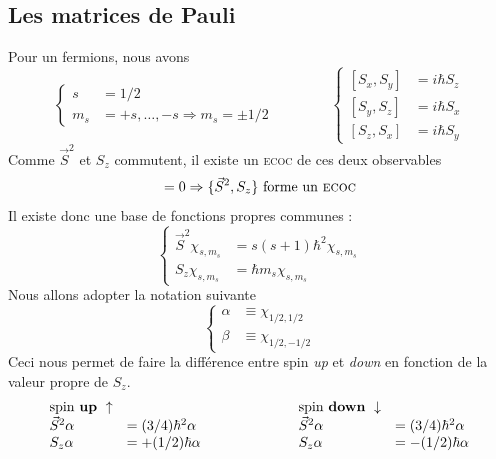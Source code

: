 \subsection{Les matrices de Pauli}
Pour un fermions, nous avons 
\begin{equation}
\left\{\begin{array}{ll}
s &= 1/2\\
m_s &= +s, \dots, -s \Rightarrow m_s = \pm 1/2
\end{array}\right.\qquad\qquad\left\{\begin{array}{ll}
\left[S_x,S_y\right] &= i\hbar S_z\\
\left[S_y,S_z\right] &= i\hbar S_x\\
\left[S_z,S_x\right] &= i\hbar S_y
\end{array}\right.
\end{equation}
Comme $\vec{S}^2$ et $S_z$ commutent, il existe un \textsc{ecoc} de ces deux observables
\begin{equation}
[\vec{S}^2, S_z] = 0\Rightarrow \{\vec{S}^2, S_z\} \text{ forme un \textsc{ecoc}}
\end{equation}
Il existe donc une base de fonctions propres communes :
\begin{equation}
\left\{\begin{array}{ll}
\vec{S}^2 \chi_{s,m_s} &= s(s+1)\hbar^2\chi_{s,m_s}\\
S_z\chi_{s,m_s} &= \hbar m_s\chi_{s,m_s}
\end{array}\right.
\end{equation}
Nous allons adopter la notation suivante 
\begin{equation}
\left\{\begin{array}{ll}
\alpha &\equiv \chi_{1/2,1/2}\\
\beta &\equiv \chi_{1/2,-1/2}
\end{array}\right.
\end{equation}
Ceci nous permet de faire la différence entre spin \textit{up} et \textit{down} en fonction de la valeur
propre de $S_z$.
\begin{equation}
\begin{array}{ll}
\text{spin \textbf{up}}\ \uparrow\\
\vec{S}^2\alpha &= (3/4)\hbar^2\alpha\\
S_z\alpha &= +(1/2)\hbar \alpha
\end{array}\qquad\qquad\qquad
\begin{array}{ll}
\text{spin \textbf{down}}\ \downarrow\\
\vec{S}^2\alpha &= (3/4)\hbar^2\alpha\\
S_z\alpha &= -(1/2)\hbar \alpha
\end{array}
\end{equation}

